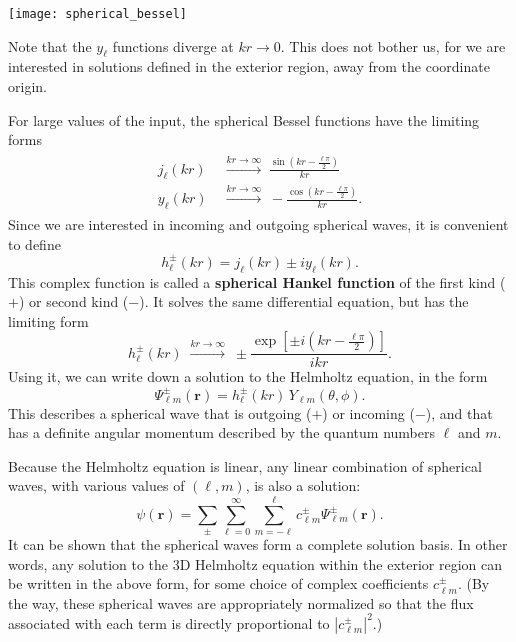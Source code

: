 \documentclass[pra,12pt]{revtex4}
\begin{document}
\vskip 0.5cm
\begin{center}
  \texttt{[image: spherical\_bessel]}
\end{center}

\noindent
Note that the $y_\ell$ functions diverge at $kr\rightarrow 0$.  This
does not bother us, for we are interested in solutions defined in the
exterior region, away from the coordinate origin.

For large values of the input, the spherical Bessel functions have the
limiting forms
\begin{align}
  \begin{aligned}j_\ell(kr)\; &\overset{kr\rightarrow\infty}{\longrightarrow} \; \frac{\sin(kr-\frac{\ell\pi}{2})}{kr} \\ y_\ell(kr)\; &\overset{kr\rightarrow\infty}{\longrightarrow} \; - \frac{\cos(kr-\frac{\ell\pi}{2})}{kr}.\end{aligned}
\end{align}
Since we are interested in incoming and outgoing spherical waves, it
is convenient to define
\begin{equation}
  h_\ell^\pm(kr) = j_\ell(kr) \pm i y_\ell(kr).
\end{equation}
This complex function is called a \textbf{spherical Hankel function}
of the first kind ($+$) or second kind ($-$).  It solves the same
differential equation, but has the limiting form
\begin{equation}
  h_\ell^\pm(kr)\; \overset{kr\rightarrow\infty}{\longrightarrow} \; \pm \frac{\exp\left[\pm i(kr-\frac{\ell\pi}{2})\right]}{ikr}.
\end{equation}
Using it, we can write down a solution to the Helmholtz equation, in
the form
\begin{equation}
  \Psi_{\ell m}^\pm(\mathbf{r}) = h_{\ell}^\pm(kr) \,Y_{\ell m}(\theta,\phi).
\end{equation}
This describes a spherical wave that is outgoing ($+$) or incoming
($-$), and that has a definite angular momentum described by the
quantum numbers $\ell$ and $m$.

Because the Helmholtz equation is linear, any linear combination of
spherical waves, with various values of $(\ell,m)$, is also a solution:
\begin{equation}
  \psi(\mathbf{r}) = \sum_\pm \sum_{\ell = 0}^\infty \sum_{m = - \ell}^\ell c_{\ell m}^\pm \Psi_{\ell m}^\pm(\mathbf{r}).
\end{equation}
It can be shown that the spherical waves form a complete solution
basis.  In other words, any solution to the 3D Helmholtz equation
within the exterior region can be written in the above form, for some
choice of complex coefficients $c_{\ell m}^\pm$.  (By the way, these
spherical waves are appropriately normalized so that the flux
associated with each term is directly proportional to $|c_{\ell
  m}^\pm|^2$.)
\end{document}
